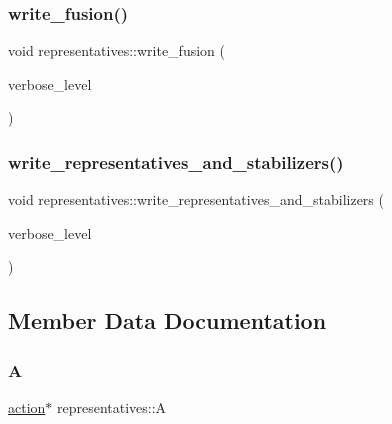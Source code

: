 \subsubsection{\texorpdfstring{write\+\_\+fusion()}{write\_fusion()}}
{\footnotesize\ttfamily void representatives\+::write\+\_\+fusion (\begin{DoxyParamCaption}\item[{\mbox{\hyperlink{galois_8h_a09fddde158a3a20bd2dcadb609de11dc}{I\+NT}}}]{verbose\+\_\+level }\end{DoxyParamCaption})}

\mbox{\label{classrepresentatives_a63e383a197b4f354b1226db6b67414df}} 
\subsubsection{\texorpdfstring{write\+\_\+representatives\+\_\+and\+\_\+stabilizers()}{write\_representatives\_and\_stabilizers()}}
{\footnotesize\ttfamily void representatives\+::write\+\_\+representatives\+\_\+and\+\_\+stabilizers (\begin{DoxyParamCaption}\item[{\mbox{\hyperlink{galois_8h_a09fddde158a3a20bd2dcadb609de11dc}{I\+NT}}}]{verbose\+\_\+level }\end{DoxyParamCaption})}



\subsection{Member Data Documentation}
\mbox{\label{classrepresentatives_a5451180b2d127fa44513c16490dca7ac}} 
\subsubsection{\texorpdfstring{A}{A}}
{\footnotesize\ttfamily \mbox{\hyperlink{classaction}{action}}$\ast$ representatives\+::A}

\mbox{\label{classrepresentatives_af2e856b05c4318e77c3abb8ae6b72fff}} 
